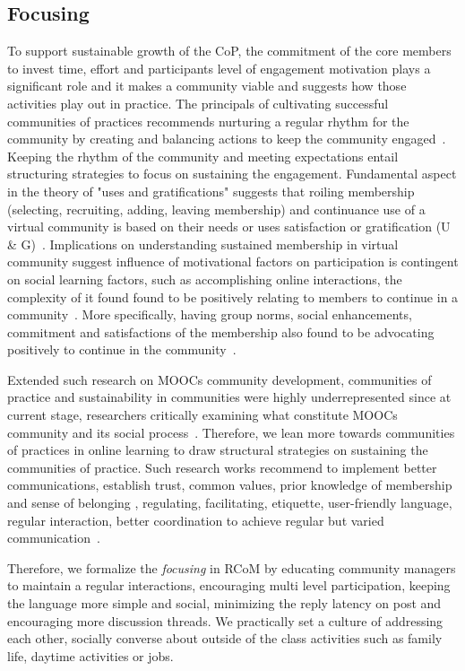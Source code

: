 \documentclass[format=acmsmall, review=false, screen=true]{acmart}
\begin{document}
\subsection{Focusing}
To support sustainable growth of the CoP, the commitment of the core members to invest time, effort and participants level of engagement motivation plays a significant role and it makes a community viable and suggests how those activities play out in practice. The principals of cultivating successful communities of practices recommends nurturing a regular rhythm for the community by creating and balancing actions to keep the community engaged~\cite{wenger2002seven}. Keeping the rhythm of the community and meeting expectations entail structuring strategies to focus on sustaining the engagement. Fundamental aspect in the theory of "uses and gratifications" suggests that roiling membership (selecting, recruiting, adding, leaving membership) and continuance use of a virtual community is based on their needs or uses satisfaction or gratification (U \& G)~\cite{sangwan2005virtual}. Implications on understanding sustained membership in virtual community suggest influence of motivational factors on participation is contingent on social learning factors, such as accomplishing online interactions, the complexity of it found found to be positively relating to members to continue in a community~\cite{sun2012understanding}. More specifically, having group norms, social enhancements, commitment and satisfactions of the membership also found to be advocating positively to continue in the community~\cite{cheung2009understanding}. 

Extended such research on MOOCs community development, communities of practice and sustainability in communities were highly underrepresented since at current stage, researchers critically examining what constitute MOOCs community and its social process~\cite{oleksandra2016untangling,poquet2018social}. Therefore, we lean more towards communities of practices in online learning to draw structural strategies on sustaining the communities of practice. Such research works recommend to implement better communications, establish trust, common values, prior knowledge of membership and sense of belonging , regulating, facilitating, etiquette, user-friendly language, regular interaction, better coordination to achieve regular but varied communication~\cite{bradbury2015role,gannon2007communities}. 

Therefore, we formalize the \textit{focusing} in RCoM by educating community managers to maintain a regular interactions, encouraging multi level participation, keeping the language more simple and social, minimizing the reply latency on post and encouraging more discussion threads. We practically set a culture of addressing each other, socially converse about outside of the class activities such as family life, daytime activities or jobs. 
\end{document}
